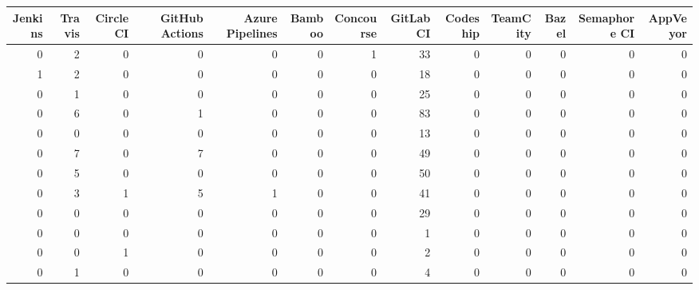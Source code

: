 \begin{tabular}{rrrrrrrrrrrrr}
\toprule
 Jenkins &  Travis &  Circle CI &  GitHub Actions &  Azure Pipelines &  Bamboo &  Concourse &  GitLab CI &  Codeship &  TeamCity &  Bazel &  Semaphore CI &  AppVeyor \\
\midrule
       0 &       2 &          0 &               0 &                0 &       0 &          1 &         33 &         0 &         0 &      0 &             0 &         0 \\
       1 &       2 &          0 &               0 &                0 &       0 &          0 &         18 &         0 &         0 &      0 &             0 &         0 \\
       0 &       1 &          0 &               0 &                0 &       0 &          0 &         25 &         0 &         0 &      0 &             0 &         0 \\
       0 &       6 &          0 &               1 &                0 &       0 &          0 &         83 &         0 &         0 &      0 &             0 &         0 \\
       0 &       0 &          0 &               0 &                0 &       0 &          0 &         13 &         0 &         0 &      0 &             0 &         0 \\
       0 &       7 &          0 &               7 &                0 &       0 &          0 &         49 &         0 &         0 &      0 &             0 &         0 \\
       0 &       5 &          0 &               0 &                0 &       0 &          0 &         50 &         0 &         0 &      0 &             0 &         0 \\
       0 &       3 &          1 &               5 &                1 &       0 &          0 &         41 &         0 &         0 &      0 &             0 &         0 \\
       0 &       0 &          0 &               0 &                0 &       0 &          0 &         29 &         0 &         0 &      0 &             0 &         0 \\
       0 &       0 &          0 &               0 &                0 &       0 &          0 &          1 &         0 &         0 &      0 &             0 &         0 \\
       0 &       0 &          1 &               0 &                0 &       0 &          0 &          2 &         0 &         0 &      0 &             0 &         0 \\
       0 &       1 &          0 &               0 &                0 &       0 &          0 &          4 &         0 &         0 &      0 &             0 &         0 \\

\end{tabular}
